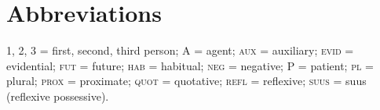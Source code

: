 \documentclass[output=paper]{LSP/langsci}
\begin{document}
\section*{Abbreviations}

1, 2, 3 = first, second, third person; A = agent; \textsc{aux} = auxiliary; \textsc{evid} = evidential; \textsc{fut} = future; \textsc{hab} = habitual; \textsc{neg} = negative; P = patient; \textsc{pl} = plural; \textsc{prox} = proximate; \textsc{quot} = quotative; \textsc{refl} = reflexive; \textsc{suus} = suus (reflexive possessive). 


\printbibliography[heading=subbibliography,notkeyword=this]

\begin{reflist}
   
\end{reflist}
\end{document}
